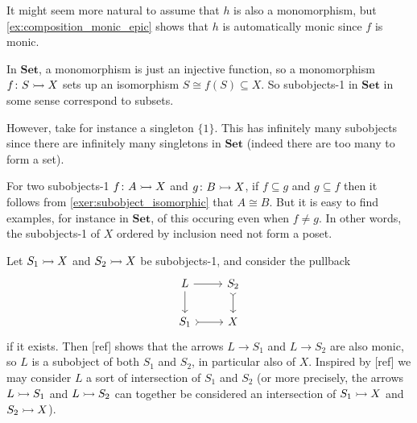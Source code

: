 \documentclass[article, a4paper, 11pt, oneside]{memoir}
\numberwithin{equation}{chapter}
\newcommand{\ncat}[1]{\mathbf{#1}} %
\newcommand{\catSet}{\ncat{Set}}
\theoremstyle{myexample}
\theoremstyle{myexamplebreak}
\begin{document}
\begin{remark}
    It might seem more natural to assume that $h$ is also a monomorphism, but \cref{ex:composition_monic_epic} shows that $h$ is automatically monic since $f$ is monic.
\end{remark}

\begin{examplebreak}
    \begin{enumexample}
        \item In $\catSet$, a monomorphism is just an injective function, so a monomorphism $f \colon S \rightarrowtail X$ sets up an isomorphism $S \cong f(S) \subseteq X$. So subobjects-1 in $\catSet$ in some sense correspond to subsets.
        
        However, take for instance a singleton $\{1\}$. This has infinitely many subobjects since there are infinitely many singletons in $\catSet$ (indeed there are too many to form a set).
        
        \item For two subobjects-1 $f \colon A \rightarrowtail X$ and $g \colon B \rightarrowtail X$, if $f \subseteq g$ and $g \subseteq f$ then it follows from \cref{exer:subobject_isomorphic} that $A \cong B$. But it is easy to find examples, for instance in $\catSet$, of this occuring even when $f \neq g$. In other words, the subobjects-1 of $X$ ordered by inclusion need not form a poset.

        \item Let $S_1 \rightarrowtail X$ and $S_2 \rightarrowtail X$ be subobjects-1, and consider the pullback
        \begin{equation*}
            \begin{tikzcd}
                L
                    \ar[r]
                    \ar[d]
                & S_2
                    \ar[d, tail]
                \\
                S_1
                    \ar[r, tail]
                & X
            \end{tikzcd}
        \end{equation*}
        if it exists. Then [ref] shows that the arrows $L \to S_1$ and $L \to S_2$ are also monic, so $L$ is a subobject of both $S_1$ and $S_2$, in particular also of $X$. Inspired by [ref] we may consider $L$ a sort of intersection of $S_1$ and $S_2$ (or more precisely, the arrows $L \rightarrowtail S_1$ and $L \rightarrowtail S_2$ can together be considered an intersection of $S_1 \rightarrowtail X$ and $S_2 \rightarrowtail X$).



\end{enumexample}
\end{examplebreak}
\end{document}
